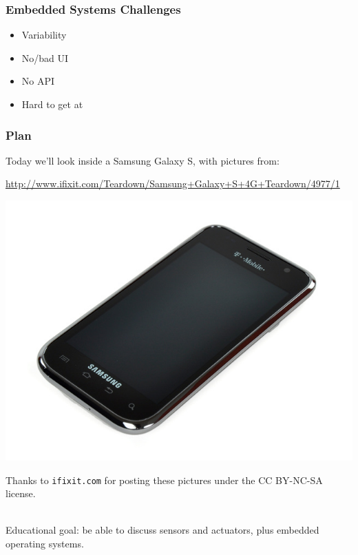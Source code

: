 \begin{frame}
\frametitle{Embedded Systems Challenges}

\begin{itemize}
\item Variability 
\item No/bad UI 
\item No API 
\item Hard to get at 
\end{itemize}
\end{frame}

\begin{frame}
\frametitle{Plan}

Today we'll look inside a Samsung Galaxy S, with pictures from:

\begin{center}
\url{http://www.ifixit.com/Teardown/Samsung+Galaxy+S+4G+Teardown/4977/1}
\end{center}

\begin{center}
\includegraphics[width=.45\textwidth]{images/GalaxyS4G1-small.jpg}
\end{center}

{\scriptsize Thanks to {\tt ifixit.com} for posting these pictures
under the CC BY-NC-SA license.}

~\\

Educational goal: be able to discuss sensors and actuators, plus embedded operating systems.

\end{frame}

